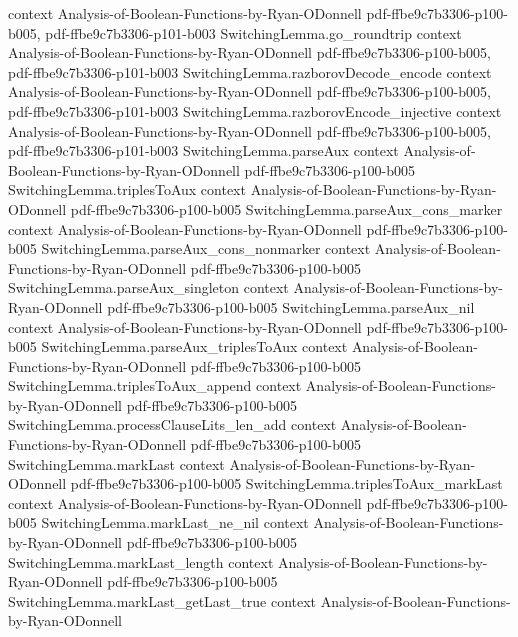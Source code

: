 \begin{lemma}
  {context}
  {Analysis-of-Boolean-Functions-by-Ryan-ODonnell}
  {pdf-ffbe9c7b3306-p100-b005,
    pdf-ffbe9c7b3306-p101-b003}
\proofstep
  {SwitchingLemma.go_roundtrip}
  {context}
  {Analysis-of-Boolean-Functions-by-Ryan-ODonnell}
  {pdf-ffbe9c7b3306-p100-b005,
    pdf-ffbe9c7b3306-p101-b003}
\proofstep
  {SwitchingLemma.razborovDecode_encode}
  {context}
  {Analysis-of-Boolean-Functions-by-Ryan-ODonnell}
  {pdf-ffbe9c7b3306-p100-b005,
    pdf-ffbe9c7b3306-p101-b003}
\proofstep
  {SwitchingLemma.razborovEncode_injective}
  {context}
  {Analysis-of-Boolean-Functions-by-Ryan-ODonnell}
  {pdf-ffbe9c7b3306-p100-b005,
    pdf-ffbe9c7b3306-p101-b003}
\proofstep
  {SwitchingLemma.parseAux}
  {context}
  {Analysis-of-Boolean-Functions-by-Ryan-ODonnell}
  {pdf-ffbe9c7b3306-p100-b005}
\proofstep
  {SwitchingLemma.triplesToAux}
  {context}
  {Analysis-of-Boolean-Functions-by-Ryan-ODonnell}
  {pdf-ffbe9c7b3306-p100-b005}
\proofstep
  {SwitchingLemma.parseAux_cons_marker}
  {context}
  {Analysis-of-Boolean-Functions-by-Ryan-ODonnell}
  {pdf-ffbe9c7b3306-p100-b005}
\proofstep
  {SwitchingLemma.parseAux_cons_nonmarker}
  {context}
  {Analysis-of-Boolean-Functions-by-Ryan-ODonnell}
  {pdf-ffbe9c7b3306-p100-b005}
\proofstep
  {SwitchingLemma.parseAux_singleton}
  {context}
  {Analysis-of-Boolean-Functions-by-Ryan-ODonnell}
  {pdf-ffbe9c7b3306-p100-b005}
\proofstep
  {SwitchingLemma.parseAux_nil}
  {context}
  {Analysis-of-Boolean-Functions-by-Ryan-ODonnell}
  {pdf-ffbe9c7b3306-p100-b005}
\proofstep
  {SwitchingLemma.parseAux_triplesToAux}
  {context}
  {Analysis-of-Boolean-Functions-by-Ryan-ODonnell}
  {pdf-ffbe9c7b3306-p100-b005}
\proofstep
  {SwitchingLemma.triplesToAux_append}
  {context}
  {Analysis-of-Boolean-Functions-by-Ryan-ODonnell}
  {pdf-ffbe9c7b3306-p100-b005}
\proofstep
  {SwitchingLemma.processClauseLits_len_add}
  {context}
  {Analysis-of-Boolean-Functions-by-Ryan-ODonnell}
  {pdf-ffbe9c7b3306-p100-b005}
\proofstep
  {SwitchingLemma.markLast}
  {context}
  {Analysis-of-Boolean-Functions-by-Ryan-ODonnell}
  {pdf-ffbe9c7b3306-p100-b005}
\proofstep
  {SwitchingLemma.triplesToAux_markLast}
  {context}
  {Analysis-of-Boolean-Functions-by-Ryan-ODonnell}
  {pdf-ffbe9c7b3306-p100-b005}
\proofstep
  {SwitchingLemma.markLast_ne_nil}
  {context}
  {Analysis-of-Boolean-Functions-by-Ryan-ODonnell}
  {pdf-ffbe9c7b3306-p100-b005}
\proofstep
  {SwitchingLemma.markLast_length}
  {context}
  {Analysis-of-Boolean-Functions-by-Ryan-ODonnell}
  {pdf-ffbe9c7b3306-p100-b005}
\proofstep
  {SwitchingLemma.markLast_getLast_true}
  {context}
  {Analysis-of-Boolean-Functions-by-Ryan-ODonnell}

\end{lemma}
